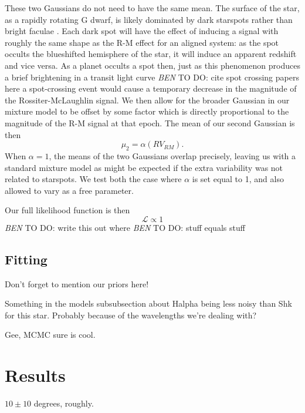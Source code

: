 \documentclass[twocolumn]{aastex63}
\newcommand{\todo}[3]{{\color{#2} \emph{#1} TO DO: #3}}
\newcommand{\btmtodo}[1]{\todo{BEN}{blue}{#1}}
\begin{document}
These two Gaussians do not need to have the same mean. 
The surface of the star, as a rapidly rotating G dwarf, is likely dominated by dark starspots rather than bright faculae \citep{Montet17}. 
Each dark spot will have the effect of inducing a signal with roughly the same shape as the R-M effect for an aligned system: as the spot occults the blueshifted hemisphere of the star, it will induce an apparent redshift and vice versa.
As a planet occults a spot then, just as this phenomenon produces a brief brightening in a transit light curve \btmtodo{cite spot crossing papers here} a spot-crossing event would cause a temporary decrease in the magnitude of the Rossiter-McLaughlin signal. 
We then allow for the broader Gaussian in our mixture model to be offset by some factor which is directly proportional to the magnitude of the R-M signal at that epoch. The mean of our second Gaussian is then
\begin{equation}
\mu_2 = \alpha (RV_{RM}).
\end{equation}
When $\alpha = 1$, the means of the two Gaussians overlap precisely, leaving us with a standard mixture model as might be expected if the extra variability was not related to starspots. 
We test both the case where $\alpha$ is set equal to 1, and also allowed to vary as a free parameter.

Our full likelihood function is then
\begin{equation}
\mathcal{L} \propto 1	
\end{equation}
\btmtodo{write this out}
where \btmtodo{stuff equals stuff}

\subsection{Fitting}





Don't forget to mention our priors here!

Something in the models subsubsection about Halpha being less noisy than Shk for this star. Probably because of the wavelengths we're dealing with?

Gee, MCMC sure is cool.


\section{Results}
\label{sec:results}

$10 \pm 10$ degrees, roughly.
\end{document}

